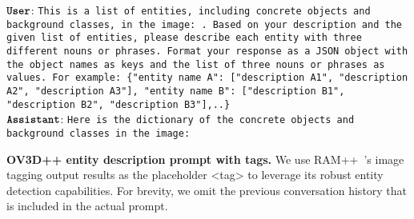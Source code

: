 \begin{table}[h]
    \centering
    \begin{minipage}{0.99\columnwidth}
        \vspace{0mm}
        \centering
        \begin{tcolorbox} 
            \raggedright
            \small
            $\texttt{\textbf{User}}$: \texttt{This is a list of entities, including concrete objects and background classes, in the image: .
            Based on your description and the given list of entities, please describe each entity with three different nouns or phrases.
            Format your response as a JSON object with the object names as keys and the list of three nouns or phrases as values.
            For example: \{"entity name A": ["description A1", "description A2", "description A3"], "entity name B": ["description B1", "description B2", "description B3"],..\}} \\
            $\texttt{\textbf{Assistant}}$: \texttt{Here is the dictionary of the concrete objects and background classes in the image:}
        \end{tcolorbox}
    \end{minipage}
    \caption{
        \textbf{OV3D++ entity description prompt with tags.}
        We use RAM++~\cite{ram_pp}'s image tagging output results as the placeholder <tag> to leverage its robust entity detection capabilities.
        For brevity, we omit the previous conversation history that is included in the actual prompt.
    }
    \label{tab:ov3dpp_prompt}
    \vspace{-4mm}
\end{table}

